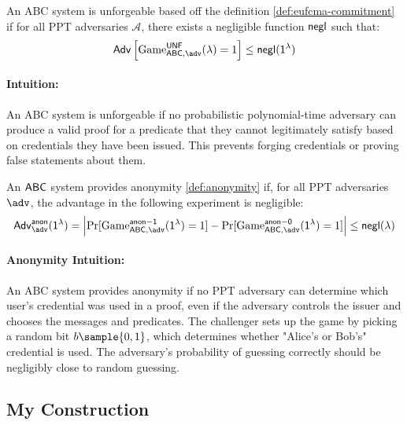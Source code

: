 \begin{definition}[Unforgeability]
An ABC system is unforgeable based off the definition \ref{def:eufcma-commitment} if for all PPT adversaries $\mathcal{A}$, there exists a negligible function $\mathsf{negl}$ such that:
\[
\mathsf{Adv}\left[\mathrm{Game}^{\mathsf{\UNF}}_{\ABC, \adv}(\lambda) = 1\right] \leq \negl(\secparam)
\]
\end{definition}

\paragraph{Intuition:} An ABC system is unforgeable if no probabilistic polynomial-time adversary can produce a valid proof for a predicate that they cannot legitimately satisfy based on credentials they have been issued. This prevents forging credentials or proving false statements about them.

\begin{definition}[Anonymity]
An $\mathsf{ABC}$ system provides anonymity \ref{def:anonymity} if, for all PPT adversaries $\adv$, the advantage in the following experiment is negligible:
\[
\mathsf{Adv}^{\mathsf{anon}}_{\adv}(\secparam) = \left| \Pr[\mathrm{Game}^{\mathsf{anon-1}}_{\ABC, \adv}(\secparam) = 1] - \Pr[\mathrm{Game}^{\mathsf{anon-0}}_{\ABC, \adv}(\secparam) = 1] \right| \leq \negl(\lambda)
\]
\end{definition}


\paragraph{Anonymity Intuition:} An ABC system provides anonymity if no PPT adversary can determine which user's credential was used in a proof, even if the adversary controls the issuer and chooses the messages and predicates. The challenger sets up the game by picking a random bit $b \sample \{0,1\}$, which determines whether "Alice's or Bob's" credential is used. The adversary's probability of guessing correctly should be negligibly close to random guessing.




\subsection{My Construction}



